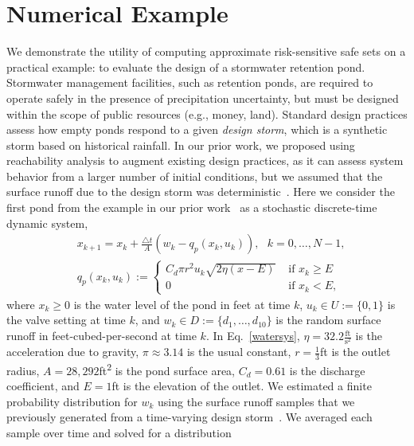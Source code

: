 \documentclass[letterpaper, 10 pt, conference]{ieeeconf}  %
\begin{document}
\section{Numerical Example}
\label{sec::ex}
We demonstrate the utility of computing approximate risk-sensitive safe sets on a practical example:
to evaluate the design of a stormwater retention pond. 
Stormwater management facilities, such as retention ponds, are required to operate safely 
in the presence of precipitation uncertainty, but must be designed within the scope of public resources (e.g., money, land). 
Standard design practices assess how empty ponds respond to a given \textit{design storm},
which is a synthetic storm based on historical rainfall.  
In our prior work, we proposed using reachability analysis to augment existing design practices, as it can assess 
system behavior from a larger number of initial conditions, but we assumed that the surface runoff due to the design storm was deterministic~\cite{sustech}.
Here we consider the first pond from the example in our prior work~\cite{sustech} as a stochastic discrete-time dynamic system,
\begin{equation}\begin{aligned}
& x_{k+1} = x_k + \frac{\triangle t}{A} (w_k - q_p(x_k, u_k)), \text{ }k = 0, \dots, N-1, \\
& q_p(x_k,u_k) := \begin{cases} C_d \pi r^2 u_k \sqrt{ 2\eta(x-E) } & \text{ if } x_k \geq E \\
						0 & \text{ if } x_k < E, \end{cases}
\end{aligned}\label{watersys}\end{equation}
where $x_k \geq 0$ is the water level of the pond in feet at time $k$, $u_k \in U := \{0, 1\}$ is the valve setting at time $k$,
and $w_k \in D := \{d_1, \dots, d_{10}\}$ is the random surface runoff in feet-cubed-per-second at time $k$.
In Eq.~\eqref{watersys}, $\eta = 32.2\frac{\text{ft}}{\text{s}^2}$ is the acceleration due to gravity, $\pi \approx 3.14$ is the usual constant, 
$r = \frac{1}{3}$ft is the outlet radius, $A = 28,292$ft\textsuperscript{2} is the pond surface area, $C_d = 0.61$ is the discharge coefficient,
and $E = 1$ft is the elevation of the outlet. %
We estimated a finite probability distribution for $w_k$ using the surface runoff samples that we previously generated from a time-varying design storm~\cite{sustech}. 
We averaged each sample over time and solved for a distribution
\end{document}
